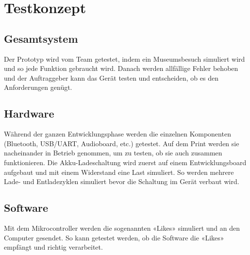 \chapter{Testkonzept}
\thispagestyle{fancy} 
\section{Gesamtsystem}
Der Prototyp wird vom Team getestet, indem ein Museumsbesuch simuliert wird und so jede Funktion gebraucht wird. Danach werden allfällige Fehler behoben und der Auftraggeber kann das Gerät testen und entscheiden, ob es den Anforderungen genügt.
\section{Hardware}
Während der ganzen Entwicklungsphase werden die einzelnen Komponenten (Bluetooth, USB/UART, Audioboard, etc.) getestet. Auf dem Print werden sie nacheinander in Betrieb genommen, um zu testen, ob sie auch zusammen funktionieren. Die Akku-Ladeschaltung wird zuerst auf einem Entwicklungsboard aufgebaut und mit einem Widerstand eine Last simuliert. So werden mehrere Lade- und Entladezyklen simuliert bevor die Schaltung im Gerät verbaut wird.
\section{Software}
Mit dem Mikrocontroller werden die sogenannten «Likes» simuliert und an den Computer gesendet. So kann getestet werden, ob die Software die «Likes» empfängt und richtig verarbeitet.